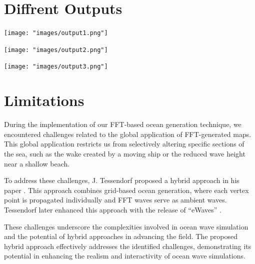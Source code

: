 \section{Diffrent Outputs}

\begin{minipage}[t]{1\textwidth}
    \centering
    \texttt{[image: "images/output1.png"]}
    \label{fig:output_1}
\end{minipage}
\begin{minipage}[t]{1\textwidth}
    \centering
    \texttt{[image: "images/output2.png"]}
    \label{fig:output_2}
\end{minipage}

\begin{minipage}{1\textwidth}
    \centering
    \texttt{[image: "images/output3.png"]}
    \label{fig:output_3}
\end{minipage}

\section{Limitations}
During the implementation of our FFT-based ocean generation technique, we encountered challenges related to the global application of FFT-generated maps. This global application restricts us from selectively altering specific sections of the sea, such as the wake created by a moving ship or the reduced wave height near a shallow beach.

To address these challenges, J. Tessendorf proposed a hybrid approach in his paper \cite{tessendorf2004}. This approach combines grid-based ocean generation, where each vertex point is propagated individually and FFT waves serve as ambient waves. Tessendorf later enhanced this approach with the release of “eWaves” \cite{tessendorf2014}.

These challenges underscore the complexities involved in ocean wave simulation and the potential of hybrid approaches in advancing the field. The proposed hybrid approach effectively addresses the identified challenges, demonstrating its potential in enhancing the realism and interactivity of ocean wave simulations.


